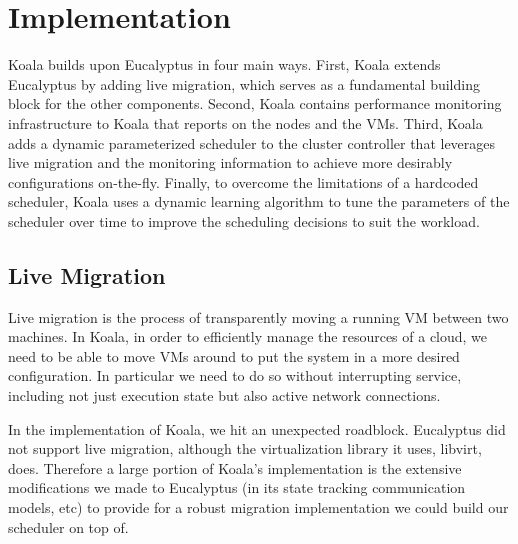 \section{Implementation}
\label{sec:impl}

Koala builds upon Eucalyptus in four main ways.  First, Koala extends
Eucalyptus by adding live migration, which serves as a fundamental building
block for the other components.  Second, Koala contains performance monitoring
infrastructure to Koala that reports on the nodes and the VMs. Third,
Koala adds a dynamic parameterized scheduler to the cluster controller that
leverages live migration and the monitoring information to achieve more
desirably configurations on-the-fly.  Finally, to overcome the limitations of a
hardcoded scheduler, Koala uses a dynamic learning algorithm to tune the
parameters of the scheduler over time to improve the scheduling decisions to
suit the workload.


\subsection{Live Migration}
Live migration is the process of transparently moving a running VM between two
machines.  In Koala, in order to efficiently manage the resources of a cloud,
we need to be able to move VMs around to put the system in a more desired
configuration. In particular we need to do so without interrupting service,
including not just execution state but also active network connections.

In the implementation of Koala, we hit an unexpected roadblock.  Eucalyptus did
not support live migration, although the virtualization library it uses,
libvirt, does.  Therefore a large portion of Koala's implementation is the
extensive modifications we made to Eucalyptus (in its state tracking
communication models, etc) to provide for a robust migration implementation we
could build our scheduler on top of.

